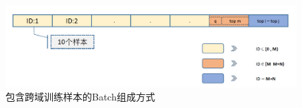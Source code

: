 \begin{figure}[h]
  \centering
  \includegraphics[width=1.0\linewidth]{Img/triplet-mining.png}
  \caption{包含跨域训练样本的Batch组成方式}
  \label{fig:triplet-mining}
\end{figure}

